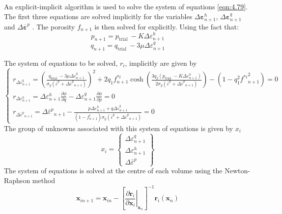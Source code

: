 \documentclass[sn-mathphys,Numbered,draft]{sn-jnl}%
\begin{document}
An explicit-implicit algorithm is used to solve the system of equations \ref{eqn:4.79}. The first three equations are solved implicitly for the variables $\Delta \boldsymbol{\varepsilon}_{n+1}^h$, $\Delta \boldsymbol{\varepsilon}_{n+1}^q$ and $\Delta \overline{\boldsymbol{\varepsilon}}^p$
. The porosity $f_{n+1}$ is then solved for explicitly. 
Using the fact that:
\begin{equation}
p_{n+1}=p_{\text {trial }}-K \Delta \varepsilon_{n+1}^h 
\end{equation}
\begin{equation}
q_{n+1}=q_{\text {trial }}-3 \mu \Delta \varepsilon_{n+1}^q
\end{equation}


The system of equations to be solved, $r_i$, implicitly are given by
\begin{equation}
\label{eqn:discritesedGTNSystem}
\left\{\begin{array}{c}
r_{\Delta \varepsilon_{n+1}^q}=\left(\frac{q_{\text {trial }}-3 \mu \Delta \varepsilon_{n+1}^q}{\sigma_y\left(\bar{\varepsilon}^p+\Delta \bar{\varepsilon}^p{ }_{n+1}\right)}\right)^2+2 q_1 f^{*i}_{n+1} \cosh \left(\frac{3 q_2\left(p_{\text {trial }}-K \Delta \varepsilon_{n+1}^h\right)}{2 \sigma_y\left(\bar{\varepsilon}^p+\Delta \bar{\varepsilon}^p{ }_{n+1}\right)}\right)-\left(1-q_1^2 {f^{*i}}^2_{n+1}\right)=0 \\
r_{\Delta \varepsilon_{n+1}^h}=\Delta \varepsilon_{n+1}^h \frac{\partial \phi}{\partial q}-\Delta \varepsilon_{n+1}^q \frac{\partial \phi}{\partial p}=0 \\
r_{\Delta \bar{\varepsilon}^p{ }_{n+1}}=\Delta \bar{\varepsilon}^p{ }_{n+1}-\frac{p \Delta \varepsilon_{n+1}^h+q \Delta \varepsilon_{n+1}^q}{(1-f^i_{n+1}) \sigma_y\left(\bar{\varepsilon}^p+\Delta \bar{\varepsilon}^p{ }_{n+1}\right)}=0
\end{array}\right.
\end{equation}
The group of unknowns associated with this system of equations is given by $x_i$
\begin{equation}
x_i=\left\{\begin{array}{c}
\Delta \varepsilon_{n+1}^q \\
\Delta \varepsilon_{n+1}^h \\
\Delta \bar{\varepsilon}^p
\end{array}\right\}
\end{equation}
The system of equations is solved at the centre of each volume using the Newton-Raphson method
\begin{equation}
\boldsymbol{x}_{i n+1}=\boldsymbol{x}_{i n}-\left[\left.\frac{\partial \boldsymbol{r}_i}{\partial \boldsymbol{x}_i}\right|_{\boldsymbol{x}_n}\right]^{-1} \boldsymbol{r}_i\left(\boldsymbol{x}_n\right)
\end{equation}
\end{document}
